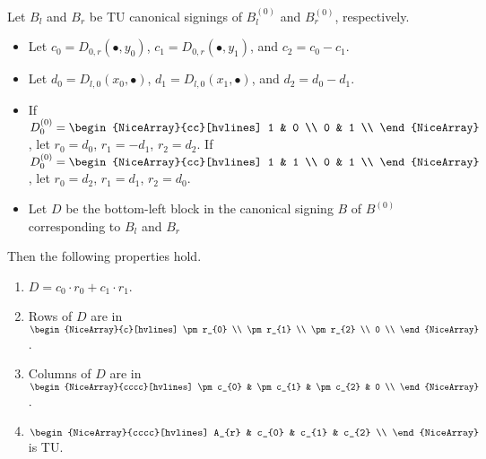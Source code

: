 \begin{lemma}\label{lem:three_sum_canonical_signing_properties}
    Let $B_{l}$ and $B_{r}$ be TU canonical signings of $B_{l}^{(0)}$ and $B_{r}^{(0)}$, respectively.
    \begin{itemize}
        \item Let $c_{0} = D_{0, r} (\bullet, y_{0})$, $c_{1} = D_{0, r} (\bullet, y_{1})$, and $c_{2} = c_{0} - c_{1}$.
        \item Let $d_{0} = D_{l, 0} (x_{0}, \bullet)$, $d_{1} = D_{l, 0} (x_{1}, \bullet)$, and $d_{2} = d_{0} - d_{1}$.
        \item If $D_{0}^{(0)} = \begin{NiceArray}{cc}[hvlines] 1 & 0 \\ 0 & 1 \\ \end{NiceArray}$, let $r_{0} = d_{0}$, $r_{1} = -d_{1}$, $r_{2} = d_{2}$. If $D_{0}^{(0)} = \begin{NiceArray}{cc}[hvlines] 1 & 1 \\ 0 & 1 \\ \end{NiceArray}$, let $r_{0} = d_{2}$, $r_{1} = d_{1}$, $r_{2} = d_{0}$.
        \item Let $D$ be the bottom-left block in the canonical signing $B$ of $B^{(0)}$ corresponding to $B_{l}$ and $B_{r}$
    \end{itemize}
    Then the following properties hold.
    \begin{enumerate}
        \item\label{item:three_sum_canonical_signing_D_eq} $D = c_{0} \cdot r_{0} + c_{1} \cdot r_{1}$.
        \item\label{item:three_sum_canonical_signing_D_rows} Rows of $D$ are in $\begin{NiceArray}{c}[hvlines] \pm r_{0} \\ \pm r_{1} \\ \pm r_{2} \\ 0 \\ \end{NiceArray}$.
        \item\label{item:three_sum_canonical_signing_D_cols} Columns of $D$ are in $\begin{NiceArray}{cccc}[hvlines] \pm c_{0} & \pm c_{1} & \pm c_{2} & 0 \\ \end{NiceArray}$.
        \item\label{item:three_sum_canonical_signing_TU_A_r_cs} $\begin{NiceArray}{cccc}[hvlines] A_{r} & c_{0} & c_{1} & c_{2} \\ \end{NiceArray}$ is TU.

\end{enumerate}
\end{lemma}
